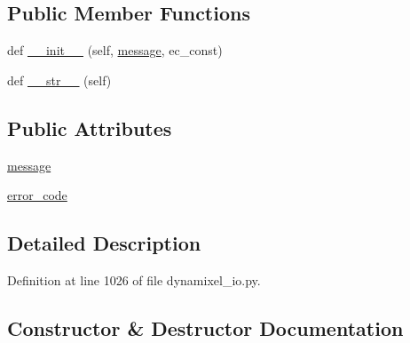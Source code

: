 \subsection*{Public Member Functions}
\begin{DoxyCompactItemize}
\item 
def \hyperlink{classdynamixel__driver_1_1dynamixel__io_1_1_fatal_error_code_error_aea044c38fc96968ef33126d67a841d52}{\+\_\+\+\_\+init\+\_\+\+\_\+} (self, \hyperlink{classdynamixel__driver_1_1dynamixel__io_1_1_fatal_error_code_error_a06957dfda7470e99c2f24b83d177f32f}{message}, ec\+\_\+const)
\item 
def \hyperlink{classdynamixel__driver_1_1dynamixel__io_1_1_fatal_error_code_error_a493309ba8a6d598d4023b82a1b872745}{\+\_\+\+\_\+str\+\_\+\+\_\+} (self)
\end{DoxyCompactItemize}
\subsection*{Public Attributes}
\begin{DoxyCompactItemize}
\item 
\hyperlink{classdynamixel__driver_1_1dynamixel__io_1_1_fatal_error_code_error_a06957dfda7470e99c2f24b83d177f32f}{message}
\item 
\hyperlink{classdynamixel__driver_1_1dynamixel__io_1_1_fatal_error_code_error_a8f0af46fff98b79b32dac599575f869a}{error\+\_\+code}
\end{DoxyCompactItemize}


\subsection{Detailed Description}


Definition at line 1026 of file dynamixel\+\_\+io.\+py.



\subsection{Constructor \& Destructor Documentation}
\mbox{\label{classdynamixel__driver_1_1dynamixel__io_1_1_fatal_error_code_error_aea044c38fc96968ef33126d67a841d52}} 
